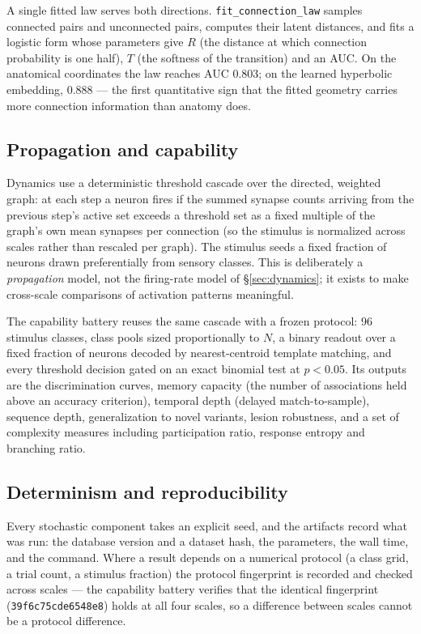 \documentclass[11pt,a4paper]{article}
\newcommand{\code}[1]{\texttt{\footnotesize #1}}
\begin{document}
A single fitted law serves both directions. \code{fit\_connection\_law} samples connected pairs
and unconnected pairs, computes their latent distances, and fits a logistic form whose parameters
give $R$ (the distance at which connection probability is one half), $T$ (the softness of the
transition) and an AUC. On the anatomical coordinates the law reaches AUC 0.803; on the learned
hyperbolic embedding, 0.888 --- the first quantitative sign that the fitted geometry carries more
connection information than anatomy does.

\subsection{Propagation and capability}
Dynamics use a deterministic threshold cascade over the directed, weighted graph: at each step a
neuron fires if the summed synapse counts arriving from the previous step's active set exceeds a
threshold set as a fixed multiple of the graph's own mean synapses per connection (so the
stimulus is normalized across scales rather than rescaled per graph). The stimulus seeds a fixed
fraction of neurons drawn preferentially from sensory classes. This is deliberately a
\emph{propagation} model, not the firing-rate model of \S\ref{sec:dynamics}; it exists to make
cross-scale comparisons of activation patterns meaningful.

The capability battery reuses the same cascade with a frozen protocol: 96 stimulus classes,
class pools sized proportionally to $N$, a binary readout over a fixed fraction of neurons
decoded by nearest-centroid template matching, and every threshold decision gated on an exact
binomial test at $p<0.05$. Its outputs are the discrimination curves, memory capacity (the number
of associations held above an accuracy criterion), temporal depth (delayed match-to-sample),
sequence depth, generalization to novel variants, lesion robustness, and a set of complexity
measures including participation ratio, response entropy and branching ratio.

\subsection{Determinism and reproducibility}
Every stochastic component takes an explicit seed, and the artifacts record what was run: the
database version and a dataset hash, the parameters, the wall time, and the command. Where a
result depends on a numerical protocol (a class grid, a trial count, a stimulus fraction) the
protocol fingerprint is recorded and checked across scales --- the capability battery verifies
that the identical fingerprint (\code{39f6c75cde6548e8}) holds at all four scales, so a
difference between scales cannot be a protocol difference.
\end{document}
